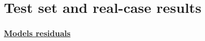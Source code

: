 



\section{Test set and real-case results}
\label{sec:results}
\subsubsection*{\underline{Models residuals}}

